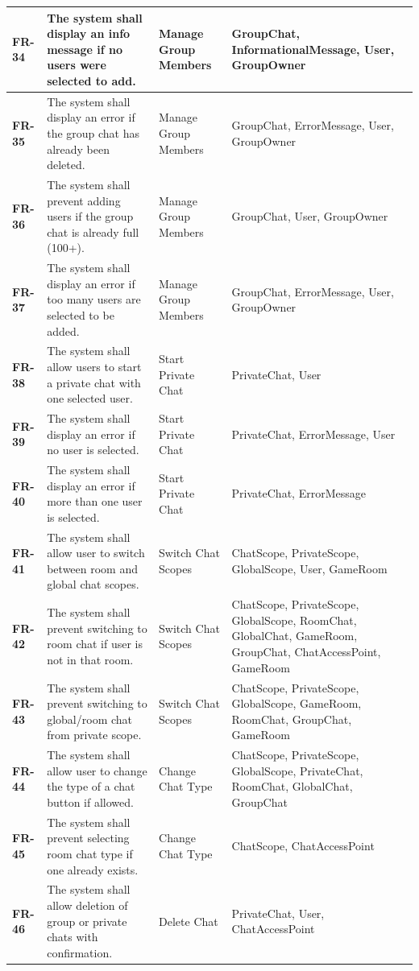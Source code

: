 \begin{longtable}{|p{3cm}|p{5.5cm}|l|p{4cm}|}
\hline
\textbf{FR-34} & The system shall display an info message if no users were selected to add. & Manage Group Members & GroupChat, InformationalMessage, User, GroupOwner  \\
\hline
\textbf{FR-35} & The system shall display an error if the group chat has already been deleted. & Manage Group Members & GroupChat, ErrorMessage, User, GroupOwner  \\
\hline
\textbf{FR-36} & The system shall prevent adding users if the group chat is already full (100+). & Manage Group Members & GroupChat, User, GroupOwner \\
\hline
\textbf{FR-37} & The system shall display an error if too many users are selected to be added. & Manage Group Members & GroupChat, ErrorMessage, User, GroupOwner \\
\hline
\textbf{FR-38} & The system shall allow users to start a private chat with one selected user. & Start Private Chat & PrivateChat, User \\
\hline
\textbf{FR-39} & The system shall display an error if no user is selected. & Start Private Chat & PrivateChat, ErrorMessage, User \\
\hline
\textbf{FR-40} & The system shall display an error if more than one user is selected. & Start Private Chat & PrivateChat, ErrorMessage \\
\hline
\textbf{FR-41} & The system shall allow user to switch between room and global chat scopes. & Switch Chat Scopes & ChatScope,  PrivateScope, GlobalScope, User, GameRoom \\
\hline
\textbf{FR-42} & The system shall prevent switching to room chat if user is not in that room. & Switch Chat Scopes & ChatScope,  PrivateScope, GlobalScope, RoomChat, GlobalChat, GameRoom, GroupChat, ChatAccessPoint, GameRoom \\
\hline
\textbf{FR-43} & The system shall prevent switching to global/room chat from private scope. & Switch Chat Scopes & ChatScope,  PrivateScope, GlobalScope, GameRoom, RoomChat, GroupChat, GameRoom \\
\hline
\textbf{FR-44} & The system shall allow user to change the type of a chat button if allowed. & Change Chat Type & ChatScope, PrivateScope, GlobalScope, PrivateChat, RoomChat, GlobalChat, GroupChat\\
\hline
\textbf{FR-45} & The system shall prevent selecting room chat type if one already exists. & Change Chat Type & ChatScope, ChatAccessPoint \\
\hline
\textbf{FR-46} & The system shall allow deletion of group or private chats with confirmation. & Delete Chat & PrivateChat, User, ChatAccessPoint \\

\end{longtable}
